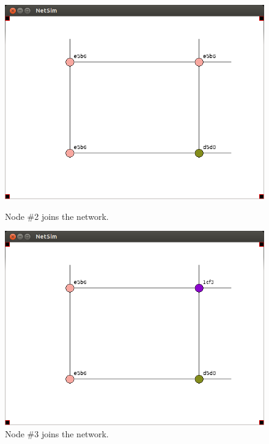 \documentclass[ %
                    author={Luke Murray},
                supervisor={Dr. Simon Hollis},
                     title={Shadow Peer-to-Peer Networks},
                  subtitle={},
                    degree={MEng},
                      year={2013} ]{thesis}
\begin{document}
\begin{figure}[h]
\begin{minipage}[b]{0.45\linewidth}
        \centering
        \includegraphics[width=\linewidth]{sim_pics/expand_3.png}
        \caption{Node \#2 joins the network.}
        \label{sim_expand3}
    \end{minipage}
    \hspace{0.5cm}
    \begin{minipage}[b]{0.45\linewidth}
        \centering
        \includegraphics[width=\linewidth]{sim_pics/expand_4.png}
        \caption{Node \#3 joins the network.}
        \label{sim_expand4}
    \end{minipage}
    \begin{minipage}[b]{0.45\linewidth}
        \centering

\end{minipage}
\end{figure}
\end{document}
